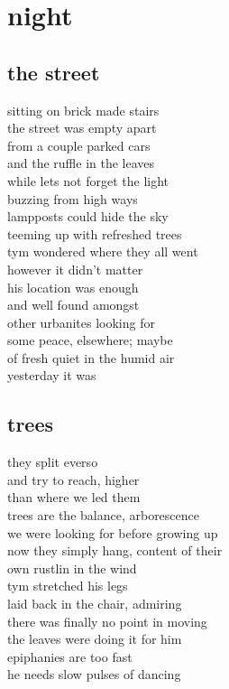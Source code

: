 \documentclass{article}
\begin{document}
\section{night}
\subsection{the street}

sitting on brick made stairs\\
the street was empty apart\\
from a couple parked cars\\
and the ruffle in the leaves\\
while lets not forget the light\\

buzzing from high ways\\
lampposts could hide the sky\\
teeming up with refreshed trees\\
tym wondered where they all went\\

however it didn't matter\\
his location was enough\\
and well found amongst\\
other urbanites looking for\\
some peace, elsewhere; maybe\\
of fresh quiet in the humid air\\
yesterday it was
\clearpage
\subsection{trees}


they split everso\\
and try to reach, higher\\
than where we led them\\
trees are the balance, arborescence\\
we were looking for before growing up\\
now they simply hang, content of their\\
own rustlin in the wind\\

tym stretched his legs\\
laid back in the chair, admiring\\
there was finally no point in moving\\
the leaves were doing it for him\\
epiphanies are too fast\\
he needs slow pulses of dancing\\
\end{document}
